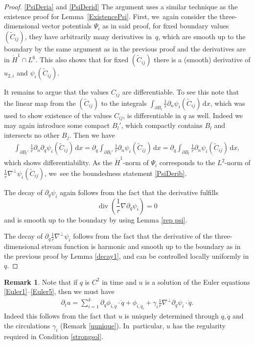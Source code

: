 \documentclass[JEP,XML,SOM,Unicode,published]{cedram}
\theoremstyle{definition}
\newtheorem{remark}[theorem]{Remark}
\renewcommand{\div}{\operatorname{div}}
\newcommand\eq{=}
\newcommand\dd{\,\mathrm{d}}
\newcommand\dx{\dd x}
\let\de\partial
\begin{document}
\skpt
\begin{proof}

\eqref{PsiDeria} and \eqref{PsiDerid} The argument uses a similar technique as the existence proof for Lem\-ma~\ref{ExistencePsi}. First, we~again consider the three-dimensional vector potentials $\Psi_i$ as in said proof, for fixed boundary values $(\tilde{C}_{ij})$, they have arbitrarily many derivatives in~$q$, which are smooth up to the boundary by the same argument as in the previous proof and the derivatives are in $\dot{H}^1\cap L^6$. This also shows that for fixed $(\tilde{C}_{ij})$ there is a (smooth) derivative of $u_{2,i}$ and $\psi_{i}(\tilde{C}_{ij})$.

It remains to argue that the values $C_{ij}$ are differentiable. To see this note that the linear map from the $(\tilde{C}_{ij})$ to the integrals $\int_{\de B_l}\frac{1}{r}\de_n\psi_i(\tilde{C}_{ij})\dx$, which was used to show existence of the values $C_{ij}$, is differentiable in $q$ as well. Indeed we may again introduce some compact $B_l'$, which compactly contains $B_l$ and intersects no other $B_{j}$. Then we have
\begin{align*}
\int_{\de B_l'}\frac{1}{r}\de_n\de_q\psi_i(\tilde{C}_{ij})\dx\eq\de_q\int_{\de B_l'}\frac{1}{r}\de_n\psi_i(\tilde{C}_{ij})\dx\eq\de_q \int_{\de B_l}\frac{1}{r}\de_n\psi_i(\tilde{C}_{ij})\dx,
\end{align*}
which shows differentiability.
As the $\dot{H}^1$-norm of $\Psi_i$ corresponds to the $L^2$-norm of $\frac{1}{r}\nabla^\perp\psi_i(\tilde{C}_{ij})$, we~see the boundedness statement \eqref{PsiDerib}.

The decay of $\de_q\psi_i$ again follows from the fact that the derivative fulfills
\begin{equation*}\div(\frac{1}{r}\nabla\de_q\psi_i)=0\end{equation*} and is smooth up to the boundary by using Lemma \ref{rep psi}.

The decay of $\de_q \frac{1}{r}\nabla^\perp\psi_i$ follows from the fact that the derivative of the three-dimensional stream function is harmonic and smooth up to the boundary as in the previous proof by Lemma \ref{decay1}, and can be controlled locally uniformly in $q$.
\end{proof}

\begin{remark}
Note that if $q$ is $C^2$ in time and $u$ is a solution of the Euler equations \eqref{Euler1}--\eqref{Euler5}, then we must have
\begin{align}\label{eqDu}
\de_t u\eq \sum_{i=1}^k\de_q \phi_{i,\dot{q}}\cdot\dot{q}+\phi_{i,\ddot{q}_i}+\gamma_i\frac{1}{r}\nabla^\perp\de_q\psi_i\cdot \dot{q}.
\end{align}
Indeed this follows from the fact that $u$ is uniquely determined through $q,\dot{q}$ and the circulations $\gamma_i$ (Remark \ref{uunique}). In~particular, $u$ has the regularity required in Condition \ref{strongsol}.

\end{remark}
\end{document}
